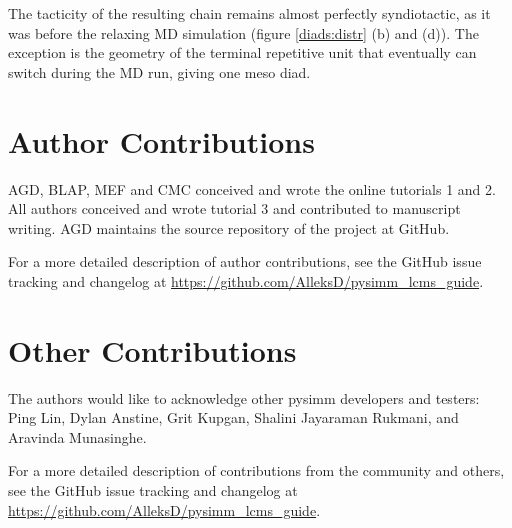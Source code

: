 \documentclass[9pt,tutorial]{livecoms}
\newcommand{\githubrepository}{\url{https://github.com/AlleksD/pysimm_lcms_guide}}
\begin{document}
The tacticity of the resulting chain remains almost perfectly syndiotactic, as it was before the relaxing MD simulation (figure \ref{diads:distr} (b) and (d)). The exception is the geometry of the terminal repetitive unit that eventually can switch during the MD run, giving one meso diad.



\section{Author Contributions}
%

AGD, BLAP, MEF and CMC conceived and wrote the online tutorials 1 and 2. All authors conceived and wrote tutorial 3 and contributed to manuscript writing. AGD maintains the source repository of the project at GitHub.

For a more detailed description of author contributions,
see the GitHub issue tracking and changelog at \githubrepository.

\section{Other Contributions}
%

The authors would like to acknowledge other pysimm developers and testers: Ping Lin, Dylan Anstine, Grit Kupgan, Shalini Jayaraman Rukmani, and Aravinda Munasinghe. 

For a more detailed description of contributions from the community and others, see the GitHub issue tracking and changelog at \githubrepository.
\end{document}
